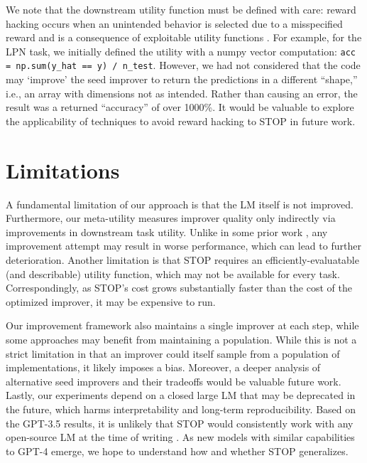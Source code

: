 \documentclass{article}
\begin{document}
We note that the downstream utility function must be defined with care: reward hacking occurs when an unintended behavior is selected due to a misspecified reward and is a consequence of exploitable utility functions \citep[see, e.g.,][]{skalse2022defining}. For example, for the LPN task, we initially defined the utility with a numpy vector computation: \lstinline{acc = np.sum(y_hat == y) / n_test}. However, we had not considered that the code may `improve' the seed improver to return the predictions in a different ``shape,'' i.e., an array with dimensions not as intended. Rather than causing an error, the result was a returned ``accuracy'' of over 1000\%.
It would be valuable to explore the applicability of techniques to avoid reward hacking \citep{amodei2016concrete,laidlaw2023preventing} to STOP in future work.




\section{Limitations}

A fundamental limitation of our approach is that the LM itself is not improved. Furthermore, our meta-utility measures improver quality only indirectly via improvements in downstream task utility. 
Unlike in some prior work \citep[e.g.,][]{schmidhuber2003godel}, any improvement attempt may result in worse performance, which can lead to further deterioration.  Another limitation is that STOP requires an efficiently-evaluatable (and describable) utility function, which may not be available for every task. Correspondingly, as STOP's cost grows substantially faster than the cost of the optimized improver, it may be expensive to run.

Our improvement framework also maintains a single improver at each step, while some approaches may benefit from maintaining a population.  While this is not a strict limitation in that an improver could itself sample from a population of implementations, it likely imposes a bias. Moreover, a deeper analysis of alternative seed improvers and their tradeoffs would be valuable future work. Lastly, our experiments depend on a closed large LM that may be deprecated in the future, which harms interpretability and long-term reproducibility. Based on the GPT-3.5 results, it is unlikely that STOP would consistently work with any open-source LM at the time of writing \citep{touvron2023llama,jiang2023mistral}. As new models with similar capabilities to GPT-4 emerge, we hope to understand how and whether STOP generalizes. 
\end{document}
